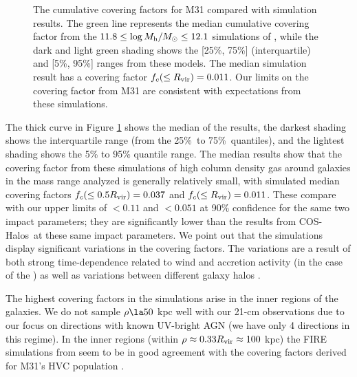 \documentclass[12pt,preprint]{aastex6}
\newcommand{\Rvir}{\ensuremath{R_{\rm vir}}\relax}
\newcommand{\coshalos}{COS-Halos}
\begin{document}
\begin{figure}
%
\caption{The cumulative covering factors for M31 compared with
  simulation results.  The green line represents the median cumulative
  covering factor from the $11.8 \le \log M_{\rm h}/M_\odot \le 12.1$
  simulations of \citeauthor{hafen2017} , while
  the dark and light green shading shows the [25\%, 75\%]
  (interquartile) and [5\%, 95\%] ranges from these models. The median
  simulation result has a covering factor $f_c (\le \Rvir) = 0.011$.
  Our limits on the covering factor from M31 are consistent with
  expectations from these
  simulations.  \label{fig:coveringfactorModels}}
%
\end{figure}

The thick curve in Figure \ref{fig:coveringfactorModels} shows the
median of the  results, the darkest shading
shows the interquartile range (from the 25\%\ to 75\%\ quantiles), and
the lightest shading shows the 5\% to 95\% quantile range.  The median
results show that the covering factor from these simulations of high
column density gas around galaxies in the mass range analyzed is
generally relatively small, with simulated median covering factors
$f_c (\le 0.5 \Rvir ) = 0.037$ and $f_c(\le R_{\rm vir}) = 0.011$.
These compare with our upper limits of $<0.11$ and $<0.051$ at 90\%
confidence for the same two impact parameters; they are significantly
lower than the results from \coshalos\ at these same impact
parameters. We point out that the simulations display significant
variations in the covering factors. The variations are a result of
both strong time-dependence related to wind and accretion activity (in
the case of the ) as well as variations between
different galaxy halos \citep[][]{cafg2015,
  muratov2015}.

The highest covering factors in the simulations arise in the inner
regions of the galaxies. We do not sample $\rho \la 50$ kpc well with
our 21-cm observations due to our focus on directions with known
UV-bright AGN (we have only 4 directions in this regime). In the inner
regions (within $\rho \approx 0.33 \Rvir \approx 100$ kpc) the FIRE
simulations from  seem to be in good
agreement with the covering factors derived for M31's HVC population
\citep{richter2012}. 
\end{document}
